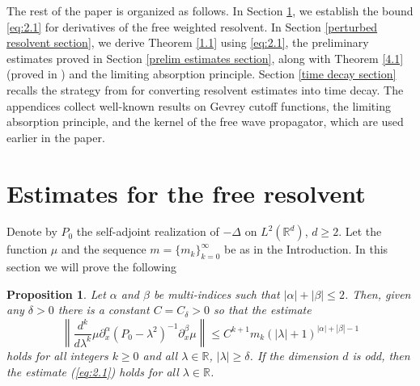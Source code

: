 \documentclass[11pt]{amsart}
\newtheorem{prop}[Theorem]{Proposition}
\numberwithin{equation}{section}
\def\R{{\mathbb R}}
\begin{document}
The rest of the paper is organized as follows. In Section \ref{free resolv est section}, we establish the bound \eqref{eq:2.1} for derivatives of the free weighted resolvent. In Section \ref{perturbed resolvent section}, we derive Theorem \ref{1.1} using \eqref{eq:2.1}, the preliminary estimates proved in Section \ref{prelim estimates section}, along with Theorem \ref{4.1} (proved in \cite{kn:LSV}) and the limiting absorption principle. Section \ref{time decay section} recalls the strategy from \cite{kn:LSV} for converting resolvent estimates into time decay. The appendices collect well-known results on Gevrey cutoff functions, the limiting absorption principle, and the kernel of the free wave propagator, which are used earlier in the paper.



\section{Estimates for the free resolvent} \label{free resolv est section}

Denote by $P_0$ the self-adjoint realization of $-\Delta$
on $L^2(\mathbb{R}^d)$, $d\ge 2$. Let the function $\mu$ and the sequence $m=\{m_k\}_{k=0}^\infty$ be as in the Introduction. 
In this section we will prove the following 

\begin{prop} \label{2.1}
Let $\alpha$ and $\beta$ be multi-indices such that $|\alpha|+|\beta|\le 2$.
 Then, given any $\delta>0$ there is a constant $C=C_\delta>0$ so that the estimate 
\begin{equation}\label{eq:2.1}
\left\|\frac{d^k}{d\lambda^k}\mu\partial_x^\alpha(P_0-\lambda^2)^{-1}\partial_x^\beta\mu\right\|\le C^{k+1}m_k(|\lambda|+1)^{|\alpha|+|\beta|-1}
\end{equation}
holds for all integers $k\ge 0$ and all $\lambda\in\R$, $|\lambda|\ge\delta$. 
  If the dimension $d$ is odd, then the estimate (\ref{eq:2.1}) holds for all $\lambda\in\R$.
 \end{prop}
 
\end{document}

